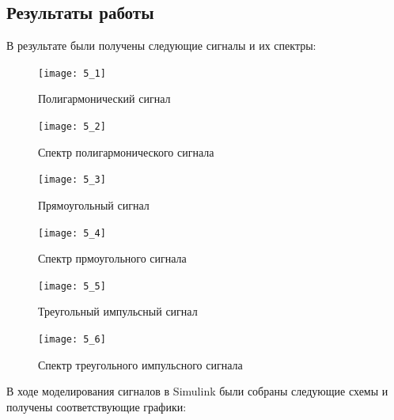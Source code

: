 \documentclass[10pt,a4paper]{article}
\begin{document}
\subsection{Результаты работы}
В результате были получены следующие сигналы и их спектры:


\begin{figure}[h]\centering
  \parbox[b]{0.49\textwidth}{\centering
    \texttt{[image: 5\_1]} 
    \caption{Полигармонический сигнал}\label{fig.l5_1}}
  \hfil\hfil 
  \begin{minipage}[b]{0.49\textwidth}
	\centering
	\texttt{[image: 5\_2]}
	\caption{Спектр полигармонического сигнала}\label{fig.l5_2} 
  \end{minipage}
\end{figure}

\begin{figure}[h]\centering
  \parbox[b]{0.49\textwidth}{\centering
    \texttt{[image: 5\_3]} 
    \caption{Прямоугольный сигнал}\label{fig.l5_3}}
  \hfil\hfil 
  \begin{minipage}[b]{0.49\textwidth}
	\centering
	\texttt{[image: 5\_4]}
	\caption{Спектр прмоугольного сигнала}\label{fig.l5_4} 
  \end{minipage}
\end{figure}

\begin{figure}[h]\centering
  \parbox[b]{0.49\textwidth}{\centering
    \texttt{[image: 5\_5]} 
    \caption{Треугольный импульсный сигнал}\label{fig.l5_5}}
  \hfil\hfil 
  \begin{minipage}[b]{0.49\textwidth}
	\centering
	\texttt{[image: 5\_6]}
	\caption{Спектр треугольного импульсного сигнала}\label{fig.l5_6} 
  \end{minipage}
\end{figure}

\FloatBarrier

В ходе моделирования сигналов в Simulink были собраны следующие схемы и получены соответствующие графики:
\end{document}
